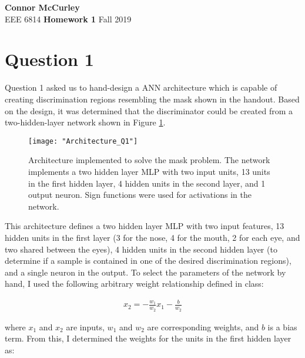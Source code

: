 \documentclass{article}[12 pt]
\begin{document}
	
\begin{center}
	\textbf{\Large Connor McCurley} \\
	EEE 6814 \qquad \textbf{\large Homework 1} \qquad Fall 2019 
\end{center}




\section*{Question 1}
Question 1 asked us to hand-design a ANN architecture which is capable of creating discrimination regions resembling the mask shown in the handout.  Based on the design, it was determined that the discriminator could be created from a two-hidden-layer network shown in Figure \ref{fig:architectureQ1}.  

\begin{center}
	\begin{figure}[h]
		\centering
		\texttt{[image: "Architecture\_Q1"]}
		\caption{Architecture implemented to solve the mask problem.  The network implements a two hidden layer MLP with two input units, 13 units in the first hidden layer, 4 hidden units in the second layer, and 1 output neuron. Sign functions were used for activations in the network. }
		\label{fig:architectureQ1}
	\end{figure}
\end{center}
\noindent
This architecture defines a two hidden layer MLP with two input features, 13 hidden units in the first layer (3 for the nose, 4 for the mouth, 2 for each eye, and two shared between the eyes), 4 hidden units in the second hidden layer (to determine if a sample is contained in one of the desired discrimination regions), and a single neuron in the output.  To select the parameters of the network by hand, I used the following arbitrary weight relationship defined in class:

\begin{align*}
	x_2 = -\frac{w_1}{w_2}x_1 - \frac{b}{w_2}
\end{align*}

\noindent
where $x_1$ and $x_2$ are inputs, $w_1$ and $w_2$ are corresponding weights, and $b$ is a bias term.  From this, I determined the weights for the units in the first hidden layer as:
\end{document}
